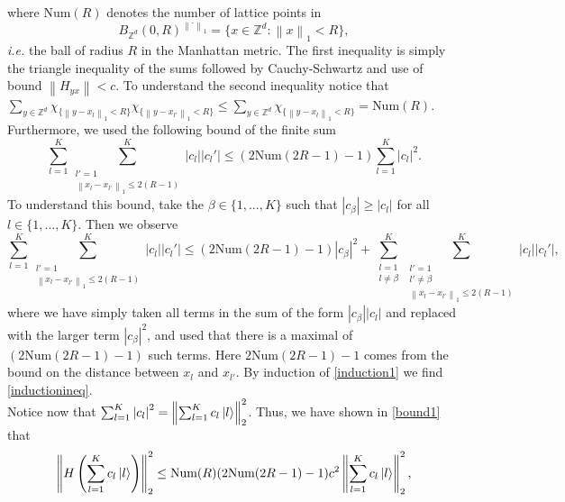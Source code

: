 \documentclass[a4paper,11pt]{article}
\newcommand{\norm}[1]{\left\lVert #1 \right\rVert}
\newcommand{\abs}[1]{\left\lvert #1 \right\rvert}
\newcommand{\Z}{\mathbb{Z}}
\numberwithin{equation}{section}
\begin{document}
 	 where $ \text{Num}(R) $ denotes the number of lattice points in \begin{equation}
 	 B_{\Z^d}(0,R)^{\norm{\cdot}_1}=\{x\in\Z^d : \norm{x}_1<R \},
 	 \end{equation} \emph{i.e.} the ball of radius $ R $ in the Manhattan metric. The first inequality is simply the triangle inequality of the sums followed by Cauchy-Schwartz and use of bound $ \norm{H_{yx}}<c $. To understand the second inequality notice that $ \sum_{y\in\Z^d}\chi_{\{\norm{y-x_l}_1<R\}}\chi_{\{\norm{y-x_{l'}}_1<R\}}\leq\sum_{y\in\Z^d}\chi_{\{\norm{y-x_l}_1<R\}}=\text{Num}(R) $. Furthermore, we used the following bound of the finite sum \begin{equation}
 	 \sum_{l=1}^{K}\sum_{\substack{l'=1\\\norm{x_l-x_{l'}}_1\leq2(R-1)}}^{K}\abs{c_l}\abs{c_l'}\leq (2\text{Num}(2R-1)-1)\sum_{l=1}^{K}\abs{c_l}^2. \label{inductionineq}
 	 \end{equation}
 	 To understand this bound, take the $ \beta\in \{1,...,K\} $ such that $ |c_\beta|\geq|c_l| $ for all $ l\in \{1,...,K\} $. Then we observe\begin{equation}
 	  \sum_{l=1}^{K}\sum_{\substack{l'=1\\\norm{x_l-x_{l'}}_1\leq2(R-1)}}^{K}\abs{c_l}\abs{c_l'}\leq (2\text{Num}(2R-1)-1)\abs{c_\beta}^2+ \sum_{\substack{l=1\\ l\neq\beta}}^{K}\sum_{\substack{l'=1\\l'\neq\beta\\\norm{x_l-x_{l'}}_1\leq2(R-1)}}^{K}\abs{c_l}\abs{c_l'},\label{induction1}
 	 \end{equation}
 	 where we have simply taken all terms in the sum of the form $ |c_\beta||c_l| $ and replaced with the larger term $ |c_\beta|^2 $, and used that there is a maximal of $ (2\text{Num}(2R-1)-1) $ such terms. Here $2\text{Num}(2R-1)-1$ comes from the bound on the distance between $ x_l $ and $ x_{l'} $. By induction of \eqref{induction1} we find \eqref{inductionineq}.\\
 	 Notice now that $ \sum_{l=1}^{K}\abs{c_l}^2=\norm{\sum_{l=1}^{K}c_l\ket{l}}_2^2 $. Thus, we have shown in \eqref{bound1} that \begin{equation}
 	 \norm{H\left(\sum_{l=1}^{K}c_l\ket{l}\right)}_2^2\leq \text{Num}(R)(2\text{Num}(2R-1)-1)c^2\norm{\sum_{l=1}^{K}c_l\ket{l}}_2^2,
 	 \end{equation} 
\end{document}
